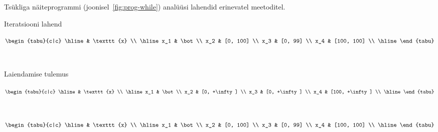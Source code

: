 \documentclass[../thesis.tex]{subfiles}
\begin{document}
\begin{table}
	\caption{Tsükliga näiteprogrammi (joonisel~\ref{fig:prog-while}) analüüsi lahendid erinevatel meetoditel.}
	\centering
	\begin{subtable}[t]{0.3\textwidth}
		\caption{Iteratsiooni lahend}
		\centering
		$\begin{tabu}{c|c}
		\hline
		 & \texttt{x} \\
		\hline
		x_1 & \bot \\
		x_2 & [0, 100] \\
		x_3 & [0, 99] \\
		x_4 & [100, 100] \\
		\hline
		\end{tabu}$
		\label{tab:while-iter}
	\end{subtable}
	~
	\begin{subtable}[t]{0.3\textwidth}
		\caption{Laiendamise tulemus}
		\centering
		$\begin{tabu}{c|c}
		\hline
		 & \texttt{x} \\
		\hline
		x_1 & \bot \\
		x_2 & [0, +\infty] \\
		x_3 & [0, +\infty] \\
		x_4 & [100, +\infty] \\
		\hline
		\end{tabu}$
		\label{tab:while-widen}
	\end{subtable}
	~
	\begin{subtable}[t]{0.3\textwidth}
		\caption{Kitsendamise tulemus}
		\centering
		$\begin{tabu}{c|c}
		\hline
		 & \texttt{x} \\
		\hline
		x_1 & \bot \\
		x_2 & [0, 100] \\
		x_3 & [0, 99] \\
		x_4 & [100, 100] \\
		\hline
		\end{tabu}$
		\label{tab:while-narrow}
	\end{subtable}
	\label{tab:itersolve-while}
\end{table}
\end{document}
